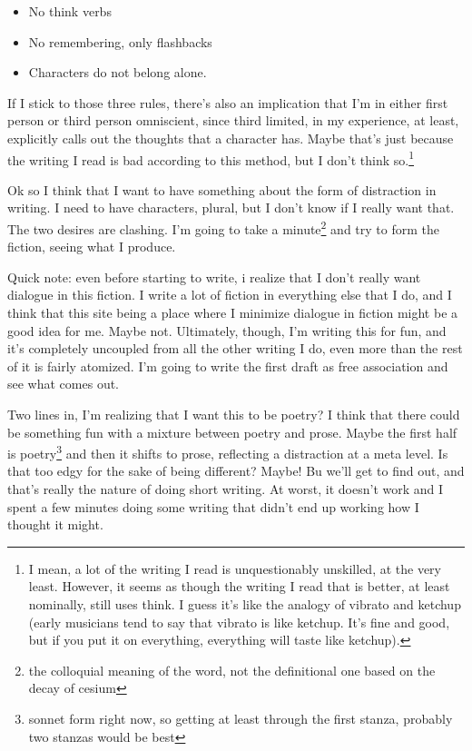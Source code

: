 \documentclass[12pt]{article}[titlepage]
\newcommand{\1}{\={a}}
\newcommand{\2}{\={e}}
\newcommand{\3}{\={\i}}
\newcommand{\4}{\=o}
\newcommand{\5}{\=u}
\newcommand{\6}{\={A}}
\renewcommand{\,}{\textsuperscript{,}}
\begin{document}
\begin{itemize}
\item No think verbs
\item No remembering, only flashbacks
\item Characters do not belong alone.
\end{itemize}

If I stick to those three rules, there's also an implication that I'm in either first person or third person omniscient, since third limited, in my experience, at least, explicitly calls out the thoughts that a character has.
Maybe that's just because the writing I read is bad according to this method, but I don't think so.\footnote{I mean, a lot of the writing I read is unquestionably unskilled, at the very least.
However, it seems as though the writing I read that is better, at least nominally, still uses think.
I guess it's like the analogy of vibrato and ketchup (early musicians tend to say that vibrato is like ketchup. It's fine and good, but if you put it on everything, everything will taste like ketchup).}

Ok so I think that I want to have something about the form of distraction in writing.
I need to have characters, plural, but I don't know if I really want that.
The two desires are clashing.
I'm going to take a minute\footnote{the colloquial meaning of the word, not the definitional one based on the decay of cesium} and try to form the fiction, seeing what I produce.

Quick note: even before starting to write, i realize that I don't really want dialogue in this fiction.
I write a lot of fiction in everything else that I do, and I think that this site being a place where I minimize dialogue in fiction might be a good idea for me.
Maybe not.
Ultimately, though, I'm writing this for fun, and it's completely uncoupled from all the other writing I do, even more than the rest of it is fairly atomized.
I'm going to write the first draft as free association and see what comes out.

Two lines in, I'm realizing that I want this to be poetry?
I think that there could be something fun with a mixture between poetry and prose.
Maybe the first half is poetry\footnote{sonnet form right now, so getting at least through the first stanza, probably two stanzas would be best} and then it shifts to prose, reflecting a distraction at a meta level.
Is that too edgy for the sake of being different?
Maybe! Bu we'll get to find out, and that's really the nature of doing short writing.
At worst, it doesn't work and I spent a few minutes doing some writing that didn't end up working how I thought it might.
\end{document}
